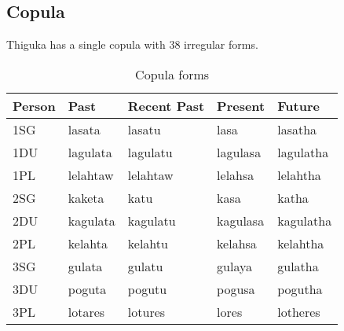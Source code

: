 \subsection{Copula}
Thiguka has a single copula with 38 irregular forms.

\begin{table}[h!]
    \centering
    \caption{Copula forms}
    \begin{tabularx}{15cm}{|X|X|X|X|X|}
        \hline
        Person & \textbf{Past} & \textbf{Recent Past} & \textbf{Present} & \textbf{Future} \\
        \hline
        1SG & lasata & lasatu & lasa & lasatha \\
        1DU & lagulata & lagulatu & lagulasa & lagulatha \\
        1PL & lelahtaw & lelahtaw & lelahsa & lelahtha \\
        2SG & kaketa & katu & kasa & katha \\
        2DU & kagulata & kagulatu & kagulasa & kagulatha \\
        2PL & kelahta & kelahtu & kelahsa & kelahtha \\
        3SG & gulata & gulatu & gulaya & gulatha \\
        3DU & poguta & pogutu & pogusa & pogutha \\
        3PL & lotares & lotures & lores & lotheres \\
        \hline
    \end{tabularx}
\end{table}



